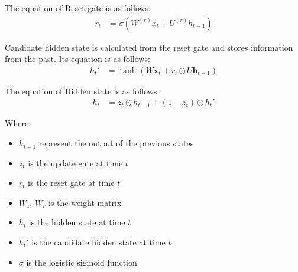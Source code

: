 \documentclass{ieeeojies}
\begin{document}
The equation of Reset gate is as follows:
\begin{align*}
r_t &= \sigma\left( W^{(r)} x_t + U^{(r)} h_{t-1} \right)
\end{align*}

Candidate hidden state is calculated from the reset gate and stores information from the past. Its equation is as follows:
\begin{align*}
h_t' &= \tanh(W \mathbf{x}_t + r_t \odot U \mathbf{h}_{t-1})
\end{align*}

The equation of Hidden state is as follows:
\begin{align*}
h_t &= z_t \odot h_{t-1} + (1 - z_t) \odot h_t'  
\end{align*}

Where:\\
    \begin{itemize}
        \item \(h_{t-1}\) represent the output of the previous states
        \item \(z_t\) is the update gate at time \(t\)
        \item \(r_t\) is the reset gate at time \(t\)
        \item \(W_z\), \(W_r\) is the weight matrix
        \item \(h_t\) is the hidden state at time \(t\)
        \item \(h_t'\) is the candidate hidden state at time \(t\)
        \item \(\sigma\) is the logistic sigmoid function \cite{gru_equation} \\
    \end{itemize}\\
\end{document}
